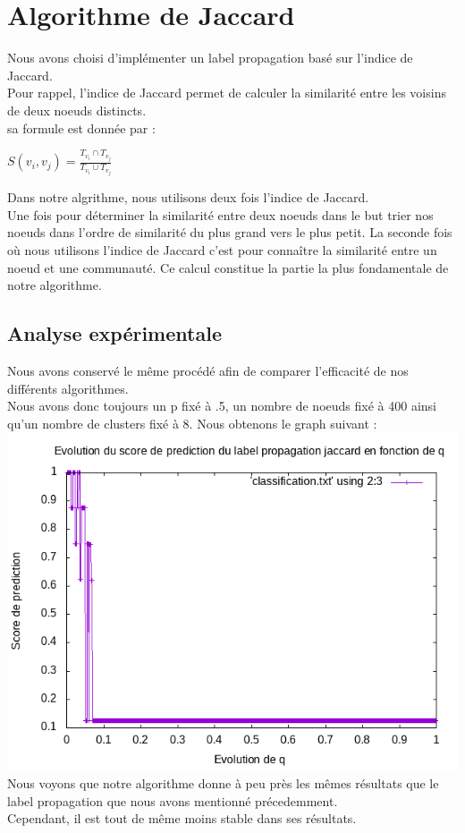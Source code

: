 \documentclass[a4paper,10pt]{report}
\begin{document}
\section{Algorithme de Jaccard}
Nous avons choisi d'implémenter un label propagation basé sur l'indice de Jaccard. 
\\
\newline
Pour rappel, l'indice de Jaccard permet de calculer la similarité entre les voisins de deux noeuds distincts.
\\
sa formule est donnée par :
\\
\begin{center}
$S(v_i,v_j) = \frac{ T_{v_i} \cap T_{v_j} }{T_{v_i} \cup T_{v_j}}$
\end{center}
Dans notre algrithme, nous utilisons deux fois l'indice de Jaccard. 
\\
Une fois pour déterminer la similarité entre deux noeuds dans le but trier nos noeuds dans l'ordre de similarité du plus grand vers le plus petit.
\newline
La seconde fois où nous utilisons l'indice de Jaccard c'est pour connaître la similarité entre un noeud et une communauté.
\newline
Ce calcul constitue la partie la plus fondamentale de notre algorithme.
\clearpage
\subsection{Analyse expérimentale}
Nous avons conservé le même procédé afin de comparer l'efficacité de nos différents algorithmes.
\\
Nous avons donc toujours un p fixé à .5, un nombre de noeuds fixé à 400 ainsi qu'un nombre de clusters fixé à 8.
Nous obtenons le graph suivant :
\newline
\\
\includegraphics[scale=0.6]{./Datas/classificationp05ScoreJaccard.png}
\\
Nous voyons que notre algorithme donne à peu près les mêmes résultats que le label propagation que nous avons mentionné précedemment.
\\
Cependant, il est tout de même moins stable dans ses résultats.
\end{document}
